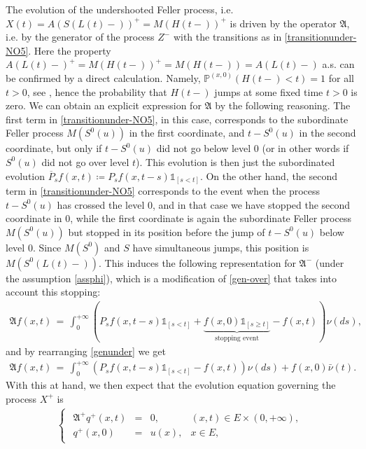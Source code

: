 \documentclass[reqno]{amsart}
\theoremstyle{remark}
\numberwithin{equation}{section} %
\newcommand{\PP}{\mathds{P}}
\newcommand{\1}{\mathds{1}}
\begin{document}
	The evolution of the undershooted Feller process, i.e. $X(t)=A(S(L(t)-))^+=M(H(t-))^+$ is driven by the operator $\mathfrak{A}$, i.e. by the generator of the process $Z^-$ with the transitions as in \eqref{transitionunder-NO5}. {Here the property $A(L(t)-)^+=M(H(t-))^+=M(H(t-))=A(L(t)-)$ a.s. can be confirmed by a direct calculation. Namely, $\PP^{(x,0)}(H(t-)<t)=1$ for all $t>0$, see \cite[Proposition 2 \& Theorem 4, in Chapter III]{bertoin1996}, hence the probability that $H(t-)$ jumps at some fixed time $t>0$ is zero.} We can obtain an explicit expression for  $\mathfrak{A}$ by the following reasoning. The first term in \eqref{transitionunder-NO5}, in this case, corresponds to the subordinate Feller process $M(S^0(u))$ in the first coordinate, and ${t-S^0(u)}$ in the second coordinate, but only if ${t-S^0(u)}$ did not go below level 0 (or in other words if ${S^0(u)}$ did not go over level $t$). This evolution is then just the subordinated evolution $\overline P_s f(x,t)\coloneqq P_sf(x,t-s) \mathds{1}_{[s < t]}$. On the other hand, the second term in \eqref{transitionunder-NO5} corresponds to the event when the process ${t-S^0(u)}$ has crossed the level 0, and in that case we have stopped the second coordinate in 0, while the first coordinate is again the subordinate Feller process $M(S^0(u))$ but stopped in its position before the jump of ${t-S^0(u)}$ below level 0. Since $M(S^0)$ and $S$ have simultaneous jumps, this position is $M(S^0(L(t)-))$. This induces the following representation for $\mathfrak{A}^-$ (under the assumption \ref{assphi}), which is a modification of \eqref{gen-over} that takes into account this stopping:
	\begin{align}
		\mathfrak{A}f(x,t) \, = \,  \int_0^{+\infty} \left( P_sf(x,t-s) \mathds{1}_{[s < t]} + \underbrace{f(x, 0) \mathds{1}_{[s \geq t]}}_{\text{stopping event}} -f(x,t)\right) \nu(ds),
		\label{genunder}
	\end{align}
	and by rearranging \eqref{genunder} we get
	\begin{align}
		\mathfrak{A}f(x,t) \, = \,  \int_0^{+\infty} \left( P_sf(x,t-s) \mathds{1}_{[s < t]}  -f(x,t)\right) \nu(ds) + f(x,0) \bar{\nu}(t).
		\label{phiddt-g}
	\end{align}
	With this at hand, we then expect that the evolution equation governing the process $X^+$ is 
	\begin{align}
		\begin{cases}\label{eq_over}
			\begin{array}{rcll}
				\mathfrak{A}^+q^+(x,t) &=& 0,  &(x,t)\in E\times (0,+\infty),\\
				q^+(x,0) &=& u(x), &x\in E,
			\end{array}
		\end{cases} 
	\end{align}
\end{document}
